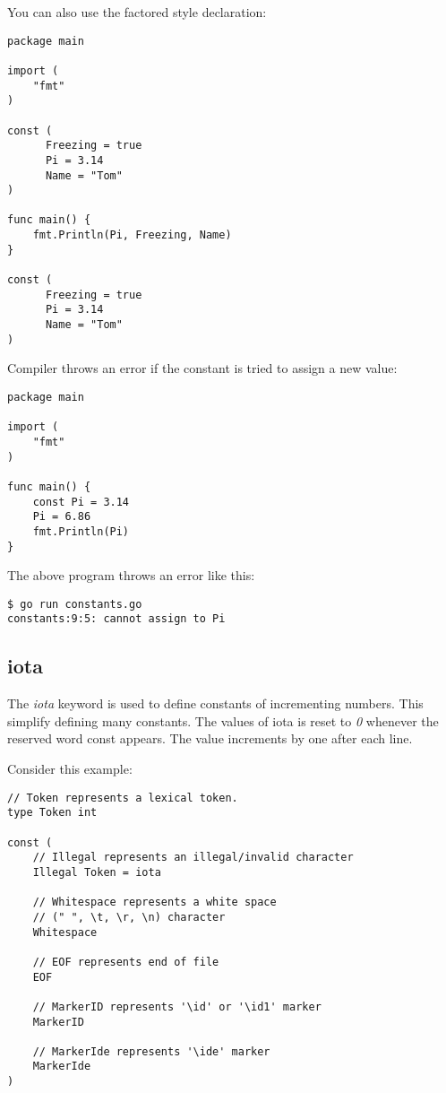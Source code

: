 You can also use the factored style declaration:

\begin{lstlisting}[numbers=none]
package main

import (
    "fmt"
)

const (
      Freezing = true
      Pi = 3.14
      Name = "Tom"
)

func main() {
    fmt.Println(Pi, Freezing, Name)
}

const (
      Freezing = true
      Pi = 3.14
      Name = "Tom"
)
\end{lstlisting}

Compiler throws an error if the constant is tried to assign a new
value:

\begin{lstlisting}[numbers=none]
package main

import (
    "fmt"
)

func main() {
    const Pi = 3.14
    Pi = 6.86
    fmt.Println(Pi)
}
\end{lstlisting}

The above program throws an error like this:

\begin{lstlisting}[numbers=none]
$ go run constants.go
constants:9:5: cannot assign to Pi
\end{lstlisting}

\subsection{iota}

The \textit{iota} keyword is used to define constants of incrementing numbers.
This simplify defining many constants. The values of iota is reset to \textit{0}
whenever the reserved word const appears. The value increments by one after each
line.

Consider this example:

\begin{lstlisting}[numbers=none]
// Token represents a lexical token.
type Token int

const (
    // Illegal represents an illegal/invalid character
    Illegal Token = iota

    // Whitespace represents a white space
    // (" ", \t, \r, \n) character
    Whitespace

    // EOF represents end of file
    EOF

    // MarkerID represents '\id' or '\id1' marker
    MarkerID

    // MarkerIde represents '\ide' marker
    MarkerIde
)
\end{lstlisting}

